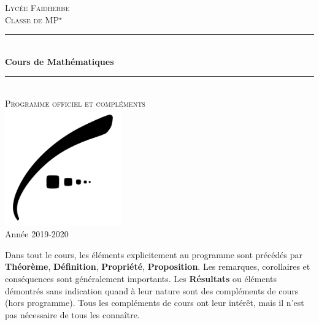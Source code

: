 \documentclass{report}
\begin{document}
\begin{center}

    \newcommand{\HRule}{\rule{\linewidth}{0.5mm}}


    \textsc{\LARGE Lycée Faidherbe}\\[1.5cm]
    \textsc{\Large Classe de MP$^\star$}\\[0.5cm]

    \HRule \\[0.4cm]
    {\huge \bfseries Cours de Mathématiques }\\[0.1cm]
    \HRule \\[0.4cm]
    \textsc{\large Programme officiel et compléments}\\[1.5cm]

    \vfill
    \includegraphics[width=5cm]{faidherbe.pdf}\\[1cm]
    \vfill
    {\large Année 2019-2020}\\
\end{center}

\dominitoc \tableofcontents

Dans tout le cours, les éléments explicitement au programme sont précédés par \textbf{Théorème}, \textbf{Définition}, \textbf{Propriété}, \textbf{Proposition}. Les remarques, corollaires et conséquences sont généralement importants. Les \textbf{Résultats} ou éléments démontrés sans indication quand à leur nature sont des compléments de cours (hors programme). Tous les compléments de cours ont leur intérêt, mais il n'est pas nécessaire de tous les connaître.
\end{document}
